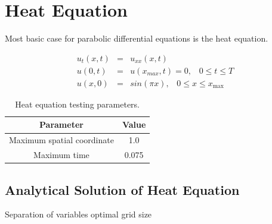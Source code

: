 \documentclass[12pt, oneside]{book}
\theoremstyle{plain}
\theoremstyle{definition}
\begin{document}
\section{Heat Equation}
Most basic case for parabolic differential equations is the heat equation.

\begin{eqnarray}
u_t(x,t) &=& u_{xx}(x, t) \\[10pt]
u(0, t) &=& u(x_{max}, t) = 0, \hspace{10pt} 0 \leq t \leq T \\[10pt]
u(x, 0) &=& sin(\pi x), \hspace{10pt} 0 \leq x \leq x_{\max}
\end{eqnarray}

\begin{table}[h!]
\centering
 \begin{tabular}{||c c||} 
 \hline
 Parameter & Value\\ [0.5ex] 
 \hline\hline
 Maximum spatial coordinate & 1.0\\ 
 Maximum time & 0.075 %

 \end{tabular}
 \caption{Heat equation testing parameters.}
\end{table}

\subsection{Analytical Solution of Heat Equation}

Separation of variables optimal grid size
\end{document}

